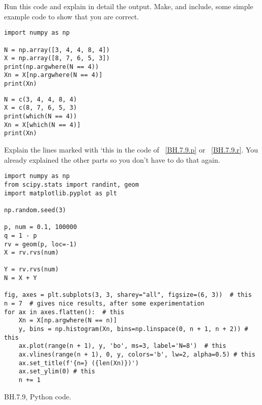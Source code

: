 \begin{exercise}
Run this code and explain in detail the output. Make, and include, some simple example code to show that you are correct.

\begin{verbatim}
import numpy as np

N = np.array([3, 4, 4, 8, 4])
X = np.array([8, 7, 6, 5, 3])
print(np.argwhere(N == 4))
Xn = X[np.argwhere(N == 4)]
print(Xn)
\end{verbatim}

\begin{verbatim}
N = c(3, 4, 4, 8, 4)
X = c(8, 7, 6, 5, 3)
print(which(N == 4))
Xn = X[which(N == 4)]
print(Xn)
\end{verbatim}
\end{exercise}

\begin{exercise}
Explain the lines marked with `this in the code of ~\cref{BH.7.9.p} or ~\cref{BH.7.9.r}. You already explained the other parts so you don't have to do that again.
\end{exercise}


\begin{listing}[!ht]
\begin{verbatim}
import numpy as np
from scipy.stats import randint, geom
import matplotlib.pyplot as plt

np.random.seed(3)

p, num = 0.1, 100000
q = 1 - p
rv = geom(p, loc=-1)
X = rv.rvs(num)

Y = rv.rvs(num)
N = X + Y

fig, axes = plt.subplots(3, 3, sharey="all", figsize=(6, 3))  # this
n = 7  # gives nice results, after some experimentation
for ax in axes.flatten():  # this
    Xn = X[np.argwhere(N == n)]
    y, bins = np.histogram(Xn, bins=np.linspace(0, n + 1, n + 2)) # this
    ax.plot(range(n + 1), y, 'bo', ms=3, label='N=8')  # this
    ax.vlines(range(n + 1), 0, y, colors='b', lw=2, alpha=0.5) # this
    ax.set_title(f'{n=} ({len(Xn)})')
    ax.set_ylim(0) # this
    n += 1
\end{verbatim}
\caption{BH.7.9, Python code.}
\label{BH.7.9.p}
\end{listing}


